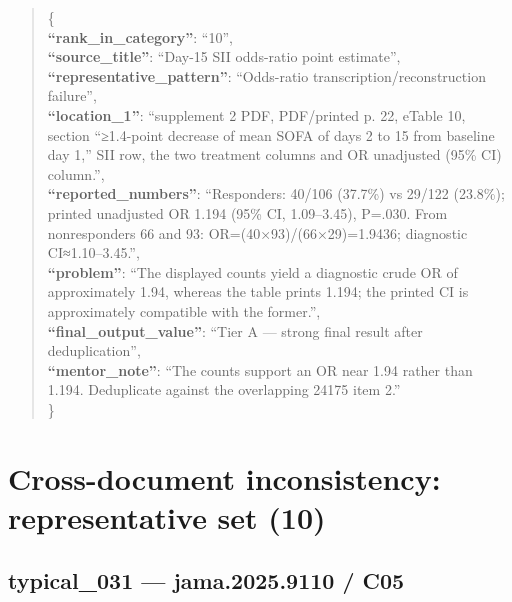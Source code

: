 \documentclass[
  letterpaper,
  9pt]{extreport}
\begin{document}
\begin{quote}
\{\\
\textbf{``rank\_in\_category''}: ``10'',\\
\textbf{``source\_title''}: ``Day-15 SII odds-ratio point estimate'',\\
\textbf{``representative\_pattern''}: ``Odds-ratio
transcription/reconstruction failure'',\\
\textbf{``location\_1''}: ``supplement 2 PDF, PDF/printed p. 22, eTable
10, section ``≥1.4-point decrease of mean SOFA of days 2 to 15 from
baseline day 1,'' SII row, the two treatment columns and OR unadjusted
(95\% CI) column.'',\\
\textbf{``reported\_numbers''}: ``Responders: 40/106 (37.7\%) vs 29/122
(23.8\%); printed unadjusted OR 1.194 (95\% CI, 1.09--3.45), P=.030.
From nonresponders 66 and 93: OR=(40×93)/(66×29)=1.9436; diagnostic
CI≈1.10--3.45.'',\\
\textbf{``problem''}: ``The displayed counts yield a diagnostic crude OR
of approximately 1.94, whereas the table prints 1.194; the printed CI is
approximately compatible with the former.'',\\
\textbf{``final\_output\_value''}: ``Tier A --- strong final result
after deduplication'',\\
\textbf{``mentor\_note''}: ``The counts support an OR near 1.94 rather
than 1.194. Deduplicate against the overlapping 24175 item 2.''\\
\}
\end{quote}

\hypertarget{cross-document-inconsistency-representative-set-10}{%
\section{Cross-document inconsistency: representative set
(10)}\label{cross-document-inconsistency-representative-set-10}}

\hypertarget{typical_031--jama20259110--c05}{%
\subsection{typical\_031 --- jama.2025.9110 /
C05}\label{typical_031--jama20259110--c05}}
\end{document}
